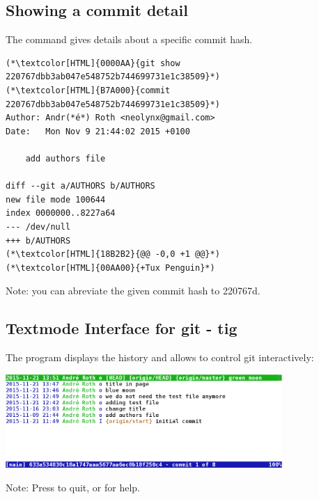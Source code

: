 \subsection{Showing a commit detail}
\begin{frame}[fragile]
  \subslidetitle
The  command gives details about a specific commit hash.

\begin{lstlisting}
(*\textcolor[HTML]{0000AA}{git show 220767dbb3ab047e548752b744699731e1c38509}*)
(*\textcolor[HTML]{B7A000}{commit 220767dbb3ab047e548752b744699731e1c38509}*)
Author: Andr(*é*) Roth <neolynx@gmail.com>
Date:   Mon Nov 9 21:44:02 2015 +0100

    add authors file

diff --git a/AUTHORS b/AUTHORS
new file mode 100644
index 0000000..8227a64
--- /dev/null
+++ b/AUTHORS
(*\textcolor[HTML]{18B2B2}{@@ -0,0 +1 @@}*)
(*\textcolor[HTML]{00AA00}{+Tux Penguin}*)
\end{lstlisting}

Note: you can abreviate the given commit hash to 220767d.
\end{frame}

\subsection{Textmode Interface for git - tig}
\begin{frame}[fragile]
  \subslidetitle
  The program  displays the history and allows to control git interactively:
  \newline \vspace{1em}
  \centerline{\includegraphics[width=10.5cm]{../screen/tig_screenshot.png}}

  \vspace{1em}
  Note: Press  to quit, or  for help.
\end{frame}

